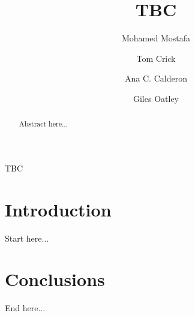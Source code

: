 \documentclass{llncs}
\begin{document}
\title{TBC}

\author{Mohamed Mostafa \and Tom
  Crick \and Ana C. Calderon \and Giles Oatley}



\maketitle

\begin{abstract}
Abstract here...
 \end{abstract}

\begin{keywords}
TBC
\end{keywords}

\section{Introduction}\label{intro}

Start here...

\section{Conclusions}\label{conclusions}

End here...



\end{document}
